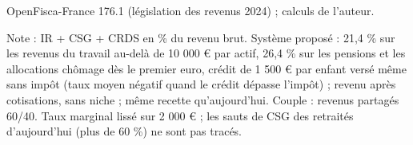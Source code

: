 OpenFisca-France 176.1 (législation des revenus 2024) ; calculs de l'auteur.\par Note : IR + CSG + CRDS en \% du revenu brut. Système proposé : 21,4 \% sur les revenus du travail au-delà de 10 000 \euro{} par actif, 26,4 \% sur les pensions et les allocations chômage dès le premier euro, crédit de 1 500 \euro{} par enfant versé même sans impôt (taux moyen négatif quand le crédit dépasse l'impôt) ; revenu après cotisations, sans niche ; même recette qu'aujourd'hui. Couple : revenus partagés 60/40. Taux marginal lissé sur 2 000 \euro{} ; les sauts de CSG des retraités d'aujourd'hui (plus de 60 \%) ne sont pas tracés.
